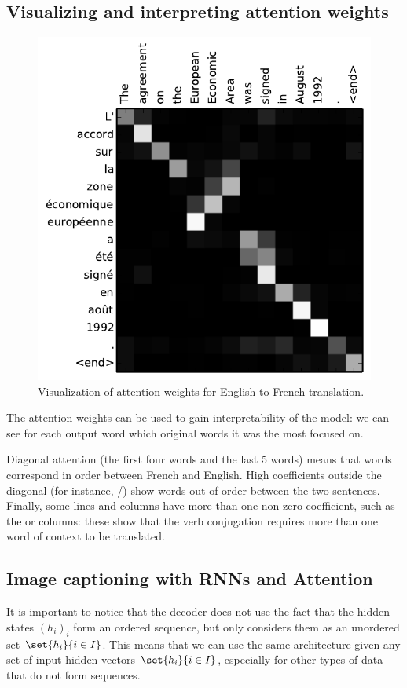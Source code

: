 \subsection{Visualizing and interpreting attention weights}
\begin{figure}
    \captionsetup{justification=raggedleft}
    \centering
    \includegraphics[width=.45\textwidth]{images/attention-visualization.pdf}
    \caption{Visualization of attention weights for English-to-French translation.\protect\footnotemark}
\end{figure}
The attention weights can be used to gain interpretability of the model: we can see for each output word which original words it was the most focused on.  

Diagonal attention (the first four words and the last 5 words) means that words correspond in order between French and English. High coefficients outside the diagonal (for instance, /) show words out of order between the two sentences. Finally, some lines and columns have more than one non-zero coefficient, such as the  or  columns: these show that the verb conjugation requires more than one word of context to be translated.

\newpage
\subsection{Image captioning with RNNs and Attention}
It is important to notice that the decoder does not use the fact that the hidden states $(h_i)_i$ form an ordered sequence, but only considers them as an unordered set $\set{h_i}{i\in I}$. This means that we can use the same architecture given any set of input hidden vectors $\set{h_i}{i\in I}$, especially for other types of data that do not form sequences.

